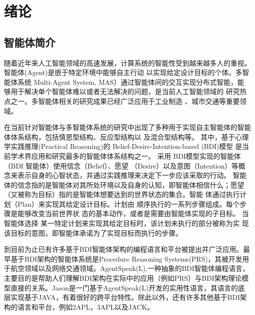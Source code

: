 \chapter{绪论}
\section{智能体简介}
随着近年来人工智能领域的高速发展，计算系统的智能性受到越来越多人的重视。智能体(Agent)是嵌于特定环境中能够自主行动 以实现给定设计目标的个体\cite{DBLP:books/daglib/0023784}。多智能体系统 Multi-Agent System, MAS）\cite{DBLP:books/daglib/0023784}通过智能体间的交互实现分布式智能，能够用于解决单个智能体难以或者无法解决的问题，是当前人工智能领域的 研究热点之一。多智能体相关的研究成果已经广泛应用于工业制造\cite{biernatzki2004agent} 、城市交通等重要领域\cite{DBLP:journals/tits/ChenC10}。

在当前针对智能体与多智能体系统的研究中出现了多种用于实现自主智能体的智能体体系结构，包括慎思型结构、反应型结构以 及混合型结构\cite{DBLP:conf/atal/2000, DBLP:journals/ker/WooldridgeJ95}等。
其中，基于心理学实践推理(Practical Reasoning)\cite{bratman1987intention}的 Belief-Desire-Intention-based (BDI)模型\cite{DBLP:conf/atal/GeorgeffPPTW98} 是当前学术界应用和研究最多的智能体体系结构之一。
%
采用 BDI模型实现的智能体（BDI 智能体）使用信念（Belief）、愿望 （Desire）以及意图（Intention）等概念来表示自身的心智状态，并通过实践推理来决定下一步应该采取的行动。
%
智能体的信念指的是智能体对其所处环境以及自身的认知，即智能体相信什么；愿望（又被称为目标）指的是智能体想要达到的世界状态的集合。智能 体通过执行计划（Plan）来实现其给定设计目标。计划由 顺序执行的一系列步骤组成。每个步骤是能够改变当前世界状 态的基本动作，或者是需要由智能体实现的子目标。
%
当智能体选择 某一特定计划来实现其给定目标时，该计划未执行的部分被称为实 现该目标的意图，即智能体承诺为了实现目标而执行的步骤。

到目前为止已有许多基于BDI智能体架构的编程语言和平台被提出并广泛应用。最早基于BDI架构的智能体系统是Procedure Reasoning Systems(PRS)，其被开发用于航空领域\cite{DBLP:conf/aaai/GeorgeffL87}以及网络交通领域\cite{DBLP:conf/aaaiss/Wobcke07}。AgentSpeak(L)\cite{DBLP:conf/maamaw/Rao96},一种抽象的BDI智能体编程语言，主要目的是帮助人们理解BDI架构在实际中的应用（例如PRS）与BDI架构理论模型直接的关系。Jason\cite{bordini2007programming}是一门基于AgentSpeak(L)开发的实用性语言，其语言的底层实现基于JAVA，有着很好的跨平台特性。除此以外，还有许多其他基于BDI架构的语言和平台，例如2APL\cite{DBLP:journals/aamas/Dastani08}，3APL\cite{DBLP:books/sp/map2005/DastaniRM05}以及JACK\cite{DBLP:books/sp/map2005/Winikoff05}。

